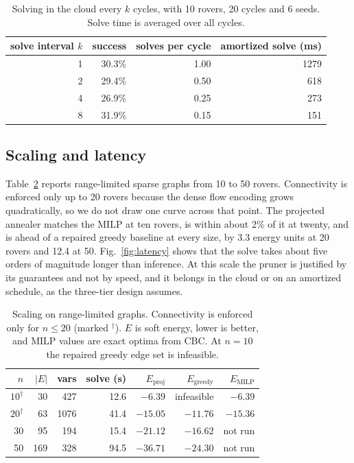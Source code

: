 \documentclass[11pt]{article}
\begin{document}
\begin{table}[t]
\centering
\caption{Solving in the cloud every $k$ cycles, with 10 rovers, 20 cycles and
6 seeds. Solve time is averaged over all cycles.}
\label{tab:staleness}
\small
\begin{tabular}{@{}rrrr@{}}
\toprule
solve interval $k$ & success & solves per cycle & amortized solve (ms) \\
\midrule
1 & 30.3\% & 1.00 & 1279 \\
2 & 29.4\% & 0.50 & 618 \\
4 & 26.9\% & 0.25 & 273 \\
8 & 31.9\% & 0.15 & 151 \\
\bottomrule
\end{tabular}
\end{table}

\subsection{Scaling and latency}

Table~\ref{tab:scaling} reports range-limited sparse graphs from 10 to 50
rovers. Connectivity is enforced only up to 20 rovers because the dense flow
encoding grows quadratically, so we do not draw one curve across that point.
The projected annealer matches the MILP at ten rovers, is within about 2\% of
it at twenty, and is ahead of a repaired greedy baseline at every size, by
3.3 energy units at 20 rovers and 12.4 at 50. Fig.~\ref{fig:latency} shows
that the solve takes about five orders of magnitude longer than inference. At
this scale the pruner is justified by its guarantees and not by speed, and it
belongs in the cloud or on an amortized schedule, as the three-tier design
assumes.

\begin{table}[t]
\centering
\caption{Scaling on range-limited graphs. Connectivity is enforced only for
$n\le20$ (marked $^\dagger$). $E$ is soft energy, lower is better, and MILP
values are exact optima from CBC. At $n=10$ the repaired greedy edge set is
infeasible.}
\label{tab:scaling}
\small
\begin{tabular}{@{}rrrrrrr@{}}
\toprule
$n$ & $|E|$ & vars & solve (s) & $E_{\mathrm{proj}}$ & $E_{\mathrm{greedy}}$ & $E_{\mathrm{MILP}}$ \\
\midrule
$10^\dagger$ & 30 & 427 & 12.6 & $-6.39$ & infeasible & $-6.39$ \\
$20^\dagger$ & 63 & 1076 & 41.4 & $-15.05$ & $-11.76$ & $-15.36$ \\
30 & 95 & 194 & 15.4 & $-21.12$ & $-16.62$ & not run \\
50 & 169 & 328 & 94.5 & $-36.71$ & $-24.30$ & not run \\
\bottomrule
\end{tabular}
\end{table}
\end{document}
